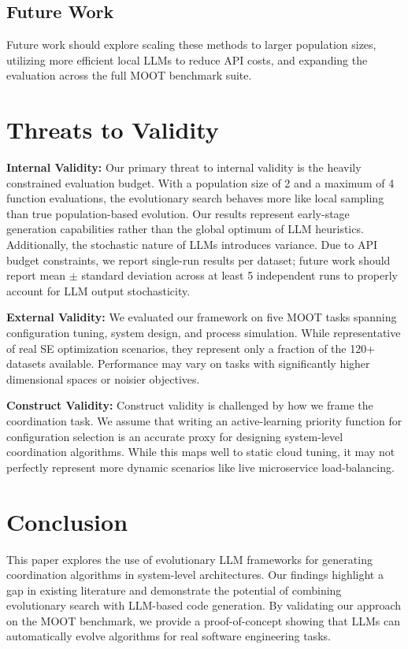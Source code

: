 \documentclass[sigconf,nonacm]{acmart}
\begin{document}
\subsection{Future Work}
Future work should explore scaling these methods to larger population sizes, utilizing more efficient local LLMs to reduce API costs, and expanding the evaluation across the full MOOT benchmark suite.

\section{Threats to Validity}

\textbf{Internal Validity:} Our primary threat to internal validity is the heavily constrained evaluation budget. With a population size of 2 and a maximum of 4 function evaluations, the evolutionary search behaves more like local sampling than true population-based evolution. Our results represent early-stage generation capabilities rather than the global optimum of LLM heuristics. Additionally, the stochastic nature of LLMs introduces variance. Due to API budget constraints, we report single-run results per dataset; future work should report mean $\pm$ standard deviation across at least 5 independent runs to properly account for LLM output stochasticity.

\textbf{External Validity:} We evaluated our framework on five MOOT tasks spanning configuration tuning, system design, and process simulation. While representative of real SE optimization scenarios, they represent only a fraction of the 120+ datasets available. Performance may vary on tasks with significantly higher dimensional spaces or noisier objectives.

\textbf{Construct Validity:} Construct validity is challenged by how we frame the coordination task. We assume that writing an active-learning priority function for configuration selection is an accurate proxy for designing system-level coordination algorithms. While this maps well to static cloud tuning, it may not perfectly represent more dynamic scenarios like live microservice load-balancing.

\section{Conclusion}

This paper explores the use of evolutionary LLM frameworks for generating coordination algorithms in system-level architectures. Our findings highlight a gap in existing literature and demonstrate the potential of combining evolutionary search with LLM-based code generation. By validating our approach on the MOOT benchmark, we provide a proof-of-concept showing that LLMs can automatically evolve algorithms for real software engineering tasks.
\end{document}
